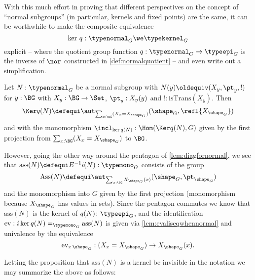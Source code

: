 With this much effort in proving that different perspectives on the concept of ``normal subgroups'' (in particular, kernels and fixed points) are the same, it can be worthwhile to make the composite equivalence
$$\ker\,q:\typenormal_G\we\typekernel_G$$
explicit -- where the quotient group function $q:\typenormal_G\to\typeepi_G$ is the inverse of $\nor$ constructed in \cref{def:normalquotient} --  and even write out a simplification.

Let $N:\typenormal_G$ be a normal subgroup with $N(y)\oldequiv (X_y,\pt_y,!)$ for $y:\BG$ with $X_y:\BG\to\Set$, $\pt_y:X_y(y)$ and $!:\mathrm{isTrans}(X_y)$.
Then
$$\Ker q(N)\defequi\aut_{\sum_{x:\BG}(X_x=X_{\shape_G})}(\shape_G,\refl{X_{\shape_G}})
$$
and with the monomorphism $\incl_{\ker q(N)}:\Hom(\Ker q(N),G)$ given by the first projection from $\sum_{x:\BG}(X_x=X_{\shape_G})$ to $\BG$.

However, going the other way around the pentagon of \cref{lem:diagfornormal}, we see that $\mathrm{ass}(N)\defequi E^{-1}i(N):\typemono_G$ consists of the group
$$\mathrm{Ass}(N)\defequi\aut_{\sum_{x:\BG}X_{\shape_G}(x)}(\shape_G,\pt_{\shape_G})
$$
and the monomorphism into $G$ given by the first projection (monomorphism because $X_{\shape_G}$ has values in sets).  Since the pentagon commutes we know that $\mathrm{ass}(N)$ is the kernel of $q(N)\colon\typeepi_G$, and the identification $\mathrm{ev}:i\ker q(N)=_{\typemono_G}\mathrm{ass}(N)$ is given via \cref{lem:evaliseqwhennormal} and univalence by the equivalence
$$\mathrm{ev}_{x\,\shape_G}:(X_x=X_{\shape_G})\to X_{\shape_G}(x)%
.$$



Letting the proposition that $\mathrm{ass}(N)$ is a kernel be invisible in the notation we may summarize the above as follows:


